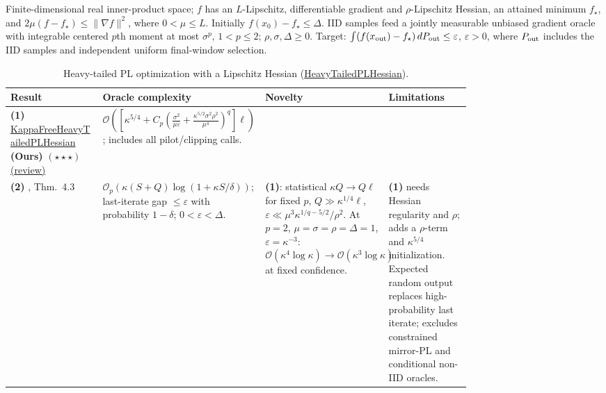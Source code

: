 \begin{table}[tp]
\centering
\caption{Heavy-tailed PL optimization with a Lipschitz Hessian (\href{https://github.com/k3nfalt/longtails/blob/main/LongTails/Setups/HeavyTailedPLHessian.lean}{HeavyTailedPLHessian}).}\label{tab:HeavyTailedPLHessian}
\parbox{\linewidth}{\footnotesize Finite-dimensional real inner-product space; $f$ has an $L$-Lipschitz, differentiable gradient and $\rho$-Lipschitz Hessian, an attained minimum $f_\star$, and $2\mu(f-f_\star)\leq\|\nabla f\|^2$, where $0<\mu\leq L$. Initially $f(x_0)-f_\star\leq\Delta$. IID samples feed a jointly measurable unbiased gradient oracle with integrable centered $p$th moment at most $\sigma^p$, $1<p\leq2$; $\rho,\sigma,\Delta\geq0$. Target: $\int(f(x_{\rm out})-f_\star)\,dP_{\rm out}\leq\varepsilon$, $\varepsilon>0$, where $P_{\rm out}$ includes the IID samples and independent uniform final-window selection.}\par\smallskip
\begin{threeparttable}
\footnotesize
\setlength{\tabcolsep}{4pt}\renewcommand{\arraystretch}{1.25}
\begin{tabularx}{\linewidth}{@{}>{\raggedright\arraybackslash}p{0.20\linewidth}>{\raggedright\arraybackslash}p{0.32\linewidth}>{\raggedright\arraybackslash}p{0.25\linewidth}>{\raggedright\arraybackslash}X@{}}
\toprule
\textbf{Result} & \textbf{Oracle complexity} & \textbf{Novelty} & \textbf{Limitations} \\
\midrule
\textbf{(1)} \href{https://github.com/k3nfalt/longtails/blob/main/LongTails/Theorems/KappaFreeHeavyTailedPLHessian.lean}{Kappa\allowbreak Free\allowbreak Heavy\allowbreak Tailed\allowbreak PL\allowbreak Hessian} \textbf{(Ours)} $(\star\star\star)$ \href{https://github.com/k3nfalt/longtails/blob/main/scripts/reviews/KappaFreeHeavyTailedPLHessian.md}{(review)} & $\mathcal{O}\!\left(\left[\kappa^{5/4}+C_p\left(\frac{\sigma^2}{\mu\varepsilon}+\frac{\kappa^{5/2}\sigma^2\rho^2}{\mu^4}\right)^q\right]\ell\right)$; includes all pilot/clipping calls. & & \\
\midrule[1.2pt]
\textbf{(2)} \citep{htplOu2026v2}, Thm.~4.3 & $\mathcal{O}_p\!\left(\kappa(S+Q)\log(1+\kappa S/\delta)\right)$; last-iterate gap $\leq\varepsilon$ with probability $1-\delta$; $0<\varepsilon<\Delta$. & \textbf{(1)}: statistical $\kappa Q\to Q\ell$ for fixed $p$, $Q\gg\kappa^{1/4}\ell$, $\varepsilon\ll\mu^3\kappa^{1/q-5/2}/\rho^2$. At $p=2$, $\mu=\sigma=\rho=\Delta=1$, $\varepsilon=\kappa^{-3}$: $\mathcal{O}(\kappa^4\log\kappa)\to\mathcal{O}(\kappa^3\log\kappa)$ at fixed confidence. & \textbf{(1)} needs Hessian regularity and $\rho$; adds a $\rho$-term and $\kappa^{5/4}$ initialization. Expected random output replaces high-probability last iterate; excludes constrained mirror-PL and conditional non-IID oracles. \\

\end{tabularx}
\end{threeparttable}
\end{table}
